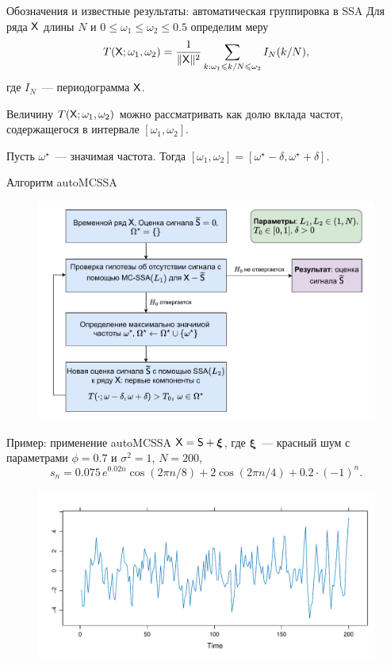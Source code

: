 \documentclass[notheorems, handout]{beamer}
\begin{document}
\begin{frame}{Обозначения и известные результаты: автоматическая группировка в SSA}
	Для ряда $\mathsf{X}$ длины $N$ и $0\leqslant\omega_1\leqslant\omega_2\leqslant0.5$ определим меру
	$$
	T(\mathsf{X}; \omega_1,\omega_2)=\frac{1}{\|\mathsf{X}\|^2}\sum_{k:\omega_1\leqslant k / N \leqslant \omega_2}I_N(k / N),
	$$
	где $I_N$~--- периодограмма $\mathsf{X}$. \medskip
	
	Величину $T(\mathsf{X}; \omega_1, \omega_2)$ можно рассматривать как долю вклада частот, содержащегося в интервале $[\omega_1, \omega_2]$.\bigskip

	Пусть $\omega^\star$~--- значимая частота. Тогда $[\omega_1, \omega_2]=[\omega^\star-\delta, \omega^\star + \delta]$.
\end{frame}

\begin{frame}{Алгоритм autoMCSSA}
	\begin{figure}
		\centering
		\includegraphics[width=\textwidth]{img/auto_mcssa_alg.pdf}
	\end{figure}
\end{frame}

\begin{frame}{Пример: применение autoMCSSA}
	$\mathsf{X}=\mathsf{S}+\boldsymbol{\xi}$, где $\boldsymbol{\xi}$~--- красный шум с параметрами $\phi=0.7$ и $\sigma^2=1$, $N=200$,
	$$
	s_n=0.075\,e^{0.02n}\cos(2\pi n / 8) + 2\cos(2\pi n / 4) + 0.2\cdot (-1)^n.
	$$\vspace{-2.5em}
	\begin{figure}
		\centering
		\includegraphics[width=\textwidth]{img/noise_ts.pdf}
	\end{figure}
\end{frame}
\end{document}
